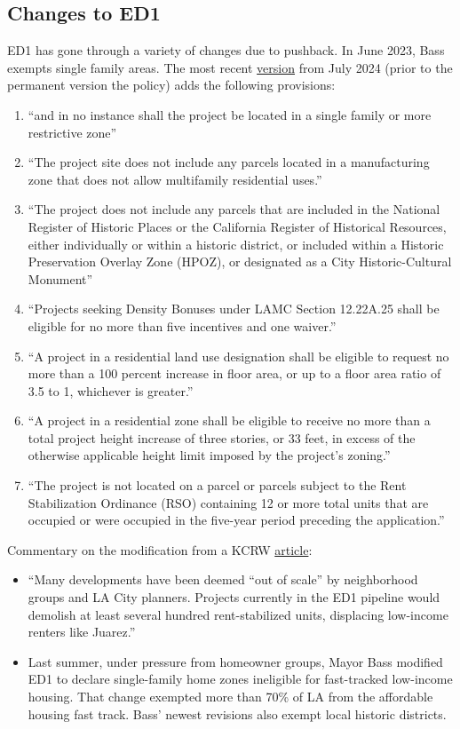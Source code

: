 \documentclass[12pt]{article}
\theoremstyle{definition}
\begin{document}
\subsection{Changes to ED1}
ED1 has gone through a variety of changes due to pushback. In June 2023, Bass exempts single family areas. The most recent \hyperlink{https://planning.lacity.gov/odocument/4bdff0d5-a458-4bcc-a8c5-451e4af45ea7/ED1_revised_memo_3.pdf}{version} from July 2024 (prior to the permanent version the policy) adds the following provisions:
\begin{enumerate}
    \item ``and in no instance shall the project be located in a single family or more restrictive zone''
    \item ``The project site does not include any parcels located in a manufacturing zone that does not allow multifamily residential uses.''
    \item ``The project does not include any parcels that are included in the National Register of Historic Places or the California Register of Historical Resources, either individually or within a historic district, or included within a Historic Preservation Overlay Zone (HPOZ), or designated as a City Historic-Cultural Monument''
    \item ``Projects seeking Density Bonuses under LAMC Section 12.22A.25 shall be eligible for no more than five incentives and one waiver.'' 
    \item ``A project in a residential land use designation shall be eligible to request no more than a 100 percent increase in floor area, or up to a floor area ratio of 3.5 to 1, whichever is greater.''
    \item ``A project in a residential zone shall be eligible to receive no more than a total project height increase of three stories, or 33 feet, in excess of the otherwise applicable height limit imposed by the project's zoning.''
    \item ``The project is not located on a parcel or parcels subject to the Rent Stabilization Ordinance (RSO) containing 12 or more total units that are occupied or were occupied in the five-year period preceding the application.''
\end{enumerate}

Commentary on the modification from a KCRW \hyperlink{https://www.kcrw.com/shows/kcrw-features/stories/ed1-eviction-affordable-housing}{article}:
\begin{itemize}
    \item ``Many developments have been deemed “out of scale” by neighborhood groups and LA City planners. Projects currently in the ED1 pipeline would demolish at least several hundred rent-stabilized units, displacing low-income renters like Juarez.''
    \item Last summer, under pressure from homeowner groups, Mayor Bass modified ED1 to declare single-family home zones ineligible for fast-tracked low-income housing. That change exempted more than 70\% of LA from the affordable housing fast track. Bass’ newest revisions also exempt local historic districts.
\end{itemize}
\end{document}
